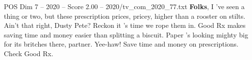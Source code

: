 \begin{textsample}{POS Dim 7 – 2020 – Score 2.00 – 2020/tv\_com\_2020\_77.txt}  \label{ex:f7_pos_083}
\textbf{Folks}, I 've seen a thing or two, but these prescription prices, pricey, higher than a rooster on stilts.
Ain't that right, Dusty Pete?
Reckon it 's time we rope them in.
Good Rx makes saving time and money easier than splitting a biscuit.
Paper 's looking mighty big for its britches there, partner.
Yee-haw!
Save time and money on prescriptions.
Check Good Rx.

\end{textsample}
